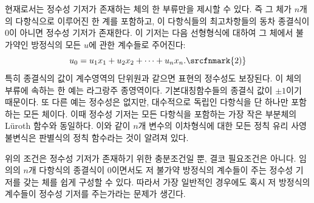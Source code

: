 
현재로서는 정수성 기저가 존재하는 체의 한 부류만을 제시할 수 있다. 즉 그 체가 $n$개의 다항식으로 이루어진 한 계를 포함하고, 이 다항식들의 최고차항들의 동차 종결식이 0이 아니면 정수성 기저가 존재한다. 이 기저는 다음 선형형식에 대하여 그 체에서 불가약인 방정식의 모든 $u$에 관한 계수들로 주어진다:
\[
  u_0=u_1x_1+u_2x_2+\cdots+u_nx_n.\srcfnmark{2)}
\]
특히 종결식의 값이 계수영역의 단위원과 같으면 표현의 정수성도 보장된다. 이 체의 부류에 속하는 한 예는 라그랑주 종영역이다. 기본대칭함수들의 종결식 값이 $\pm 1$이기 때문이다. 또 다른 예는 정수성은 없지만, 대수적으로 독립인 다항식을 단 하나만 포함하는 모든 체이다. 이때 정수성 기저는 모든 다항식을 포함하는 가장 작은 부분체의 Lüroth 함수와 동일하다. 이와 같이 $n$개 변수의 이차형식에 대한 모든 정칙 유리 사영불변식은 판별식의 정칙 함수라는 것이 알려져 있다.

위의 조건은 정수성 기저가 존재하기 위한 충분조건일 뿐, 결코 필요조건은 아니다. 임의의 $n$개 다항식의 종결식이 0이면서도 저 불가약 방정식의 계수들이 주는 정수성 기저를 갖는 체를 쉽게 구성할 수 있다. 따라서 가장 일반적인 경우에도 혹시 저 방정식의 계수들이 정수성 기저를 주는가라는 문제가 생긴다.
